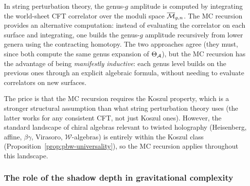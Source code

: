 \begin{remark}
\label{rem:thqg-VII-string-comparison}
In string perturbation theory, the genus-$g$ amplitude is
computed by integrating the world-sheet CFT correlator over
the moduli space $\overline{\mathcal{M}}_{g,n}$. The MC recursion
provides an alternative computation: instead of evaluating the
correlator on each surface and integrating, one builds the
genus-$g$ amplitude recursively from lower genera using the
contracting homotopy. The two approaches agree (they must,
since both compute the same genus expansion of $\Theta_{\mathcal{A}}$),
but the MC recursion has the advantage of being
\emph{manifestly inductive}: each genus level builds on the
previous ones through an explicit algebraic formula, without
needing to evaluate correlators on new surfaces.

The price is that the MC recursion requires the Koszul
property, which is a stronger structural assumption than what
string perturbation theory uses (the latter works for any
consistent CFT, not just Koszul ones). However, the standard
landscape of chiral algebras relevant to twisted holography
(Heisenberg, affine, $\beta\gamma$, Virasoro, $\mathcal{W}$-algebras)
is entirely within the Koszul class
(Proposition~\ref{prop:pbw-universality}), so the MC recursion
applies throughout this landscape.
\end{remark}

\subsubsection{The role of the shadow depth in gravitational
complexity}
\label{subsubsec:thqg-VII-depth-gravity}

